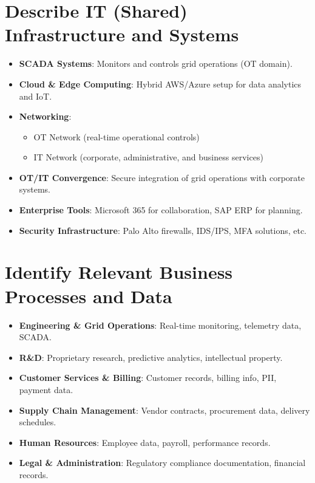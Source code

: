 \section{Describe IT (Shared) Infrastructure and Systems}
\begin{itemize}
    \item \textbf{SCADA Systems}: Monitors and controls grid operations (OT domain).
    \item \textbf{Cloud \& Edge Computing}: Hybrid AWS/Azure setup for data analytics and IoT.
    \item \textbf{Networking}:
        \begin{itemize}
            \item OT Network (real-time operational controls)
            \item IT Network (corporate, administrative, and business services)
        \end{itemize}
    \item \textbf{OT/IT Convergence}: Secure integration of grid operations with corporate systems.
    \item \textbf{Enterprise Tools}: Microsoft 365 for collaboration, SAP ERP for planning.
    \item \textbf{Security Infrastructure}: Palo Alto firewalls, IDS/IPS, MFA solutions, etc.
\end{itemize}

\section{Identify Relevant Business Processes and Data}
\begin{itemize}
    \item \textbf{Engineering \& Grid Operations}: Real-time monitoring, telemetry data, SCADA.
    \item \textbf{R\&D}: Proprietary research, predictive analytics, intellectual property.
    \item \textbf{Customer Services \& Billing}: Customer records, billing info, PII, payment data.
    \item \textbf{Supply Chain Management}: Vendor contracts, procurement data, delivery schedules.
    \item \textbf{Human Resources}: Employee data, payroll, performance records.
    \item \textbf{Legal \& Administration}: Regulatory compliance documentation, financial records.
\end{itemize}

